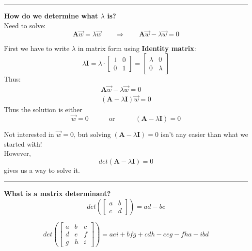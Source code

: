 \documentclass{article}
\newcommand{\ind}{\-\hspace{1cm}}
\begin{document}
\rule[0.5ex]{\linewidth}{1pt}
\pagebreak

\textbf{How do we determine what $\lambda$ is?}\\
Need to solve:
\begin{equation*}
	\mathbf{A} \vec{w} = \lambda \vec{w} \qquad \Rightarrow \qquad	\mathbf{A} \vec{w} - \lambda \vec{w} = 0
\end{equation*}

First we have to write $\lambda$ in matrix form using \textbf{Identity matrix}:
\begin{equation*}
	\lambda  \mathbf{I} = \lambda \cdot \begin{bmatrix} 1 & 0\\ 0 & 1 	\end{bmatrix} = \begin{bmatrix} \lambda & 0\\ 0 & \lambda 	\end{bmatrix} 
\end{equation*}
Thus:
\begin{align*}
	\mathbf{A} \vec{w} - \lambda \vec{w} = 0\\
	(\mathbf{A} - \lambda \mathbf{I}) \vec{w} = 0
\end{align*}
Thus the solution is either
\begin{equation*}
	\vec{w}=0 \quad \quad \quad \text{or} \quad \quad \quad (\mathbf{A} - \lambda \mathbf{I}) = 0
\end{equation*}

Not interested in $\vec{w} = 0$, but solving $(\mathbf{A} - \lambda \mathbf{I})=0$ isn't any easier than what we started with!\\
However,
\begin{equation*}
	det(\mathbf{A}-\lambda \mathbf{I})=0
\end{equation*}
\ind gives us a way to solve it.

\rule[0.5ex]{\linewidth}{1pt}

\textbf{What is a matrix determinant?}
\begin{equation*}
	det\left( \begin{bmatrix} a & b \\ c & d \end{bmatrix} \right) = a d - b c
\end{equation*}

\begin{equation*}
	det\left( \begin{bmatrix} a & b & c \\ d & e & f \\ g & h & i \end{bmatrix} \right) = aei + bfg + cdh - ceg - fha - ibd
\end{equation*}
\end{document}
